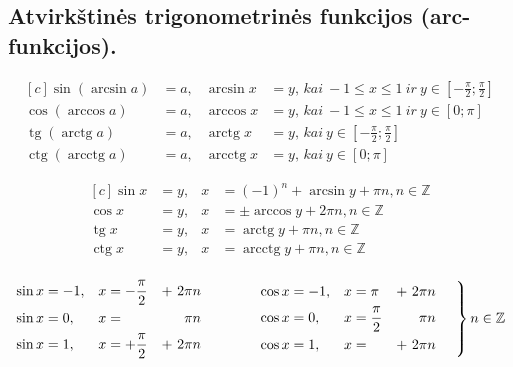 \documentclass[fleqn]{article} %
\DeclareMathOperator{\tg}{tg}
\DeclareMathOperator{\ctg}{ctg}
\DeclareMathOperator{\arctg}{arctg}
\DeclareMathOperator{\arcctg}{arcctg}
\begin{document}
\subsection{Atvirkštinės trigonometrinės funkcijos (arc-funkcijos).}

\begin{equation}
    \begin{aligned}[c]
        \sin(\arcsin a) &= a, & \arcsin x &= y,\,kai\ -1 \le x \le 1\ ir\ y \in \left[ -\frac{\pi}{2}; \frac{\pi}{2}\right] \\
        \cos(\arccos a) &= a, & \arccos x &= y,\,kai\ -1 \le x \le 1\ ir\ y \in \left[0;\pi\right] \\
        \tg (\arctg  a) &= a, & \arctg  x &= y,\,kai\ y \in \left[ -\frac{\pi}{2}; \frac{\pi}{2}\right]\\
        \ctg(\arcctg a) &= a, & \arcctg x &= y,\,kai\ y \in \left[0;\pi\right]
    \end{aligned}
\end{equation}

\begin{equation}
    \begin{aligned}[c]
        \sin x &= y, & x &= (-1)^n + \arcsin y + \pi{n}, n \in \mathbb{Z} \\
        \cos x &= y, & x &= \pm \arccos y + 2\pi{n}, n \in \mathbb{Z} \\
        \tg  x &= y, & x &= \arctg y + \pi{n}, n \in \mathbb{Z} \\
        \ctg x &= y, & x &= \arcctg y + \pi{n}, n \in \mathbb{Z} \\
    \end{aligned}
\end{equation}

\begin{equation}
    \left.
    \begin{aligned}[c]
        \sin x &= -1, & x &= -\frac{\pi}{2} &+\ 2\pi{n} \\
        \sin x &=  0, & x &=                &    \pi{n} \\
        \sin x &=  1, & x &= +\frac{\pi}{2} &+\ 2\pi{n}
    \end{aligned}
    \hspace {15mm}
    \begin{aligned}[c]
        \cos x &= -1, & x &= \pi            &+\ 2\pi{n} \\
        \cos x &=  0, & x &= \frac{\pi}{2}  &    \pi{n} \\
        \cos x &=  1, & x &=                &+\ 2\pi{n}
    \end{aligned}
    \hspace{5mm}
    \right\}
    n \in \mathbb{Z}
\end{equation}
\end{document}
